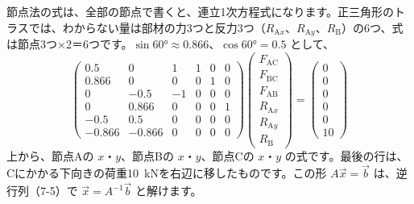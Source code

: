
\leavevmode\label{ph:力-5:sec9}節点法の式は、全部の節点で書くと、連立1次方程式になります。正三角形のトラスでは、わからない量は部材の力3つと反力3つ（$R_{\mathrm{A}x}$、$R_{\mathrm{A}y}$、$R_{\mathrm B}$）の6つ、式は節点3つ×2＝6つです。$\sin60°\approx0.866$、$\cos60°=0.5$ として、
\[
\begin{pmatrix}
0.5 & 0 & 1 & 1 & 0 & 0\\
0.866 & 0 & 0 & 0 & 1 & 0\\
0 & -0.5 & -1 & 0 & 0 & 0\\
0 & 0.866 & 0 & 0 & 0 & 1\\
-0.5 & 0.5 & 0 & 0 & 0 & 0\\
-0.866 & -0.866 & 0 & 0 & 0 & 0
\end{pmatrix}
\begin{pmatrix} F_{\mathrm{AC}}\\ F_{\mathrm{BC}}\\ F_{\mathrm{AB}}\\ R_{\mathrm{A}x}\\ R_{\mathrm{A}y}\\ R_{\mathrm B}\end{pmatrix}
=\begin{pmatrix}0\\0\\0\\0\\0\\10\end{pmatrix}
\]
上から、節点Aの $x$・$y$、節点Bの $x$・$y$、節点Cの $x$・$y$ の式です。最後の行は、Cにかかる下向きの荷重\qty{10}{kN}を右辺に移したものです。この形 $A\vec x=\vec b$ は、逆行列（7-5）で $\vec x=A^{-1}\vec b$ と解けます。

\begin{bkcenter}
\end{bkcenter}

